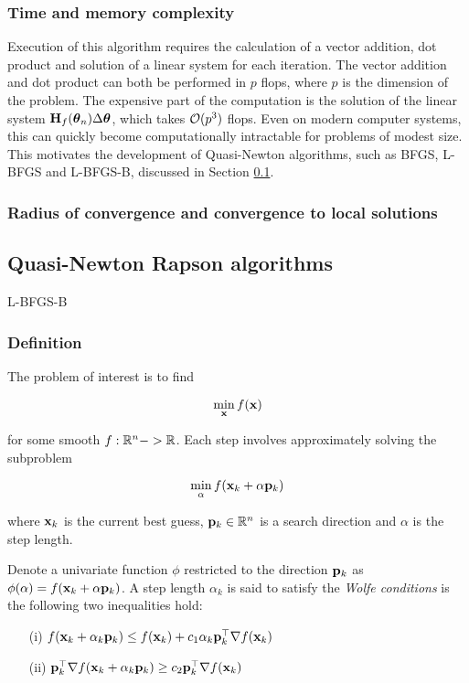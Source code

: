 \documentclass{article}[12pt]
\begin{document}
\subsubsection{Time and memory complexity}

Execution of this algorithm requires the calculation of a vector addition, dot product and solution of a
linear system for each iteration. The vector addition and dot product can both be performed in $p$ flops,
where $p$ is the dimension of the problem. The expensive part of the computation is the solution of the linear
system ${\bf H}_f({\boldsymbol \theta}_n) \Delta {\boldsymbol\theta}$, which takes ${\mathcal O}(p^3)$ flops. Even on modern computer systems, this
can quickly become computationally intractable for problems of modest size. This motivates the development
of Quasi-Newton algorithms, such as BFGS, L-BFGS and L-BFGS-B, discussed in Section \ref{sec:quasi_newton}.

\subsubsection{Radius of convergence and convergence to local solutions}

\subsection{Quasi-Newton Rapson algorithms}
\label{sec:quasi_newton}
L-BFGS-B

\subsubsection{Definition}

The problem of interest is to find

$$
\min_{\bf x} f({\bf x})
$$

for some smooth $f: {\mathbb{R}}^n -> {\mathbb{R}}$. Each step involves approximately solving the subproblem

$$
\min_\alpha f({\bf x}_k + \alpha {\bf p}_k)
$$

where ${\bf x}_k$ is the current best guess, ${\bf p}_k \in {\mathbb{R}}^n$ is a search direction and $\alpha$ is the
step length.

Denote a univariate function $\phi$ restricted to the direction ${\bf p}_k$ as
$\phi(\alpha) = f({\bf x}_k + \alpha {\bf p}_k)$. A step length $\alpha_k$ is said to satisfy the \emph{Wolfe conditions}
is the following two inequalities hold:

\begin{enumerate}
\item[(i)] $f({\bf x}_k + \alpha_k {\bf p}_k) \leq f({\bf x}_k) + c_1 \alpha_k {\bf p}_k^\top \nabla f({\bf x}_k)$ 
\item[(ii)] ${\bf p}_k^\top \nabla f({\bf x}_k + \alpha_k {\bf p}_k) \geq c_2 {\bf p}_k^\top \nabla f({\bf x}_k)$ 
\end{enumerate}
\end{document}
